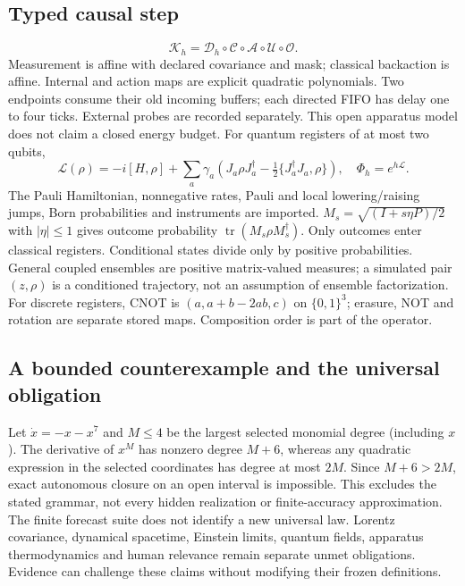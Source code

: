 \subsection{Typed causal step}
\[
 \mathcal K_h=\mathcal D_h\circ\mathcal C\circ\mathcal A\circ\mathcal U\circ\mathcal O.
\]
Measurement is affine with declared covariance and mask; classical backaction is affine. Internal and action maps are explicit quadratic polynomials. Two endpoints consume their old incoming buffers; each directed FIFO has delay one to four ticks. External probes are recorded separately. This open apparatus model does not claim a closed energy budget.
For quantum registers of at most two qubits,
\[
 \mathcal L(\rho)=-i[H,\rho]+\sum_a\gamma_a\left(J_a\rho J_a^\dagger-\tfrac12\{J_a^\dagger J_a,\rho\}\right),\quad\Phi_h=e^{h\mathcal L}.
\]
The Pauli Hamiltonian, nonnegative rates, Pauli and local lowering/raising jumps, Born probabilities and instruments are imported. $M_s=\sqrt{(I+s\eta P)/2}$ with $|\eta|\leq1$ gives outcome probability $\operatorname{tr}(M_s\rho M_s^\dagger)$. Only outcomes enter classical registers. Conditional states divide only by positive probabilities. General coupled ensembles are positive matrix-valued measures; a simulated pair $(z,\rho)$ is a conditioned trajectory, not an assumption of ensemble factorization.
For discrete registers, CNOT is $(a,a+b-2ab,c)$ on $\{0,1\}^3$; erasure, NOT and rotation are separate stored maps. Composition order is part of the operator.

\subsection{A bounded counterexample and the universal obligation}
Let $\dot x=-x-x^7$ and $M\leq4$ be the largest selected monomial degree (including $x$). The derivative of $x^M$ has nonzero degree $M+6$, whereas any quadratic expression in the selected coordinates has degree at most $2M$. Since $M+6>2M$, exact autonomous closure on an open interval is impossible. This excludes the stated grammar, not every hidden realization or finite-accuracy approximation.
The finite forecast suite does not identify a new universal law. Lorentz covariance, dynamical spacetime, Einstein limits, quantum fields, apparatus thermodynamics and human relevance remain separate unmet obligations. Evidence can challenge these claims without modifying their frozen definitions.
